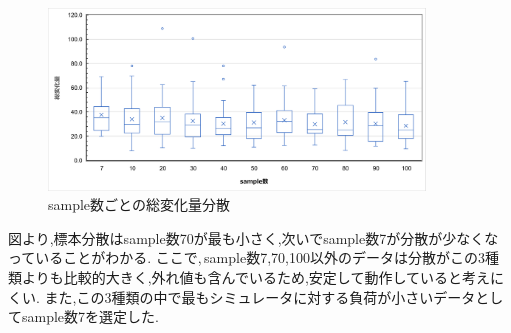 \documentclass{ltjsreport}
\begin{document}
		\begin{figure}[H]
		\centering
		\includegraphics[width = 10cm]{../figs/FVRALL.png}
		\caption{sample数ごとの総変化量分散}
		\label{fig:FVRdata}
		\end{figure}
		\vspace{-15pt}
		図より,標本分散はsample数70が最も小さく,次いでsample数7が分散が少なくなっていることがわかる.
		ここで,\,sample数7,70,100以外のデータは分散がこの3種類よりも比較的大きく,外れ値も含んでいるため,安定して動作していると考えにくい.
		また,この3種類の中で最もシミュレータに対する負荷が小さいデータとしてsample数7を選定した.
\clearpage
\end{document}
